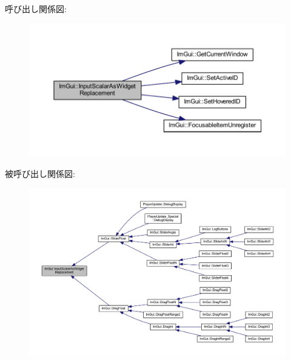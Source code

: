 呼び出し関係図\+:\nopagebreak
\begin{figure}[H]
\begin{center}
\leavevmode
\includegraphics[width=350pt]{namespace_im_gui_a9b7223f54687d740a5961d7f278e01ef_cgraph}
\end{center}
\end{figure}
被呼び出し関係図\+:\nopagebreak
\begin{figure}[H]
\begin{center}
\leavevmode
\includegraphics[width=350pt]{namespace_im_gui_a9b7223f54687d740a5961d7f278e01ef_icgraph}
\end{center}
\end{figure}
\mbox{\label{namespace_im_gui_a08c243542b1678859cf0e065f9e43865}} 
